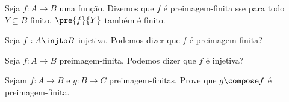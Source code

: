 \begin{definition}

%

Seja $f : A \to B$ uma função. Dizemos que $f$ é preimagem-finita sse para todo $Y \subseteq B$ finito, $\pre{f}{Y}$ também é finito.

\end{definition}


\begin{exercise}

%
%

Seja $f : A \injto B$ injetiva. Podemos dizer que $f$ é preimagem-finita?  

\end{exercise}


\begin{exercise}

%
%

Seja $f : A \to B$ preimagem-finita. Podemos dizer que $f$ é injetiva?

\end{exercise}


\begin{exercise}

%
%

Sejam $f : A \to B$ e $g : B \to C$ preimagem-finitas. Prove que $g \compose f$ é preimagem-finita.

\end{exercise}
